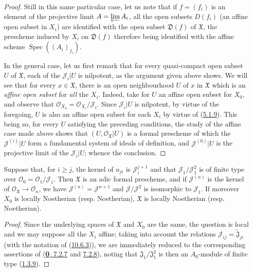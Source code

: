 \begin{proof}
Still in this same particular case, let us note that if $f=(f_i)$ is an
element of the projective limit $A=\varprojlim A_i$, all the open subsets
$D(f_i)$ (an affine open subset in $X_i$) are identified with the open
subset $\mathfrak{D}(f)$ of $\mathfrak{X}$, the prescheme induced by
$X_i$ on $\mathfrak{D}(f)$ therefore being identified with the affine
scheme $\operatorname{Spec}((A_i)_{f_i})$.

In the general case, let us first remark that for every quasi-compact
open subset $U$ of $\mathfrak{X}$, each of the $\mathscr{J}_i|U$ is
nilpotent, as the argument given above shows. We will see that for every
$x\in\mathfrak{X}$, there is an open neighbourhood $U$ of $x$ in
$\mathfrak{X}$ which is an \emph{affine open subset} for \emph{all} the $X_i$.
Indeed, take for $U$ an affine open subset for $X_0$, and observe that
$\mathscr{O}_{X_0}=\mathscr{O}_{X_i}/\mathscr{J}_i$. Since
$\mathscr{J}_i|U$ is nilpotent, by virtue of the foregoing, $U$ is also
an affine open subset for each $X_i$ by virtue of
(\hyperref[I.5.1.9]{5.1.9}). This being so, for every $U$ satisfying
the preceding conditions, the study of the affine case made above shows
that $(U,\mathscr{O}_{\mathfrak{X}}|U)$ is a formal prescheme of which
the $\mathscr{J}^{(i)}|U$ form a fundamental system of ideals of
definition, and $\mathscr{J}^{(0)}|U$ is the projective limit of the
$\mathscr{J}_i|U$; whence the conclusion.
\end{proof}

\begin{corollary}[10.6.4]
\label{I.10.6.4}
Suppose that, for $i\geq j$, the kernel of $u_{ji}$ is
$\mathscr{J}_i^{j+1}$ and that $\mathscr{J}_1/\mathscr{J}_1^2$
is of finite type over
$\mathscr{O}_0=\mathscr{O}_1/\mathscr{J}_1$. Then $\mathfrak{X}$ is
an adic formal prescheme, and if $\mathscr{J}^{(n)}$ is the kernel of
$\mathscr{O}_{\mathfrak{X}}\to\mathscr{O}_n$, we have
$\mathscr{J}^{(n)}=\mathscr{J}^{n+1}$ and
$\mathscr{J}/\mathscr{J}^2$ is isomorphic to $\mathscr{J}_1$. If
moreover $X_0$ is locally Noetherian \textup{(resp.} Noetherian),
$\mathfrak{X}$ is locally Noetherian \textup{(resp.} Noetherian).
\end{corollary}

\begin{proof}
Since the underlying spaces of $\mathfrak{X}$ and $X_0$ are the same,
the question is local and we may suppose all the $X_i$ affine;
taking into account the relations
$\mathscr{J}_{ij}=\widetilde{\mathfrak{J}}_{ji}$ (with the notation
of (\hyperref[I.10.6.3]{10.6.3})), we are immediately reduced to the
corresponding assertions of
(\hyperref[0.7.2.7]{\textbf{0}, 7.2.7} and
\hyperref[0.7.2.8]{7.2.8}), noting that
$\mathfrak{J}_1/\mathfrak{J}_1^2$ is then an $A_0$-module of finite
type (\hyperref[I.1.3.9]{1.3.9}).
\end{proof}

